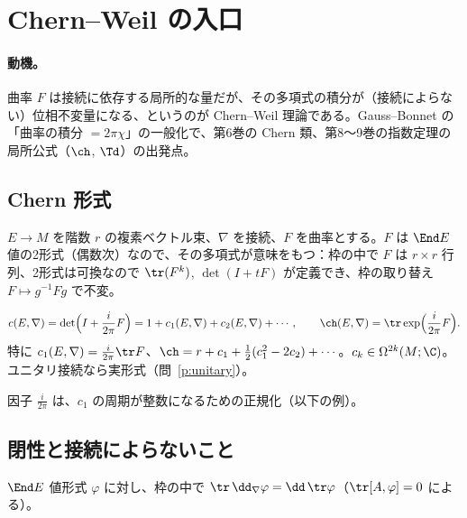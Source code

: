 
\section{Chern--Weil の入口}
\paragraph{動機。}曲率 $F$ は接続に依存する局所的な量だが、その多項式の積分が（接続によらない）位相不変量になる、というのが Chern--Weil 理論である。Gauss--Bonnet の「曲率の積分 $=2\pi\chi$」の一般化で、第6巻の Chern 類、第8〜9巻の指数定理の局所公式（$\ch$, $\Td$）の出発点。

\subsection{Chern 形式}
$E\to M$ を階数 $r$ の複素ベクトル束、$\nabla$ を接続、$F$ を曲率とする。$F$ は $\End E$ 値の2形式（偶数次）なので、その多項式が意味をもつ：枠の中で $F$ は $r\times r$ 行列、2形式は可換なので $\tr(F^k)$, $\det(I+tF)$ が定義でき、枠の取り替え $F\mapsto g^{-1}Fg$ で不変。
\begin{defn}
\[
c(E,\nabla)=\det\Bigl(I+\frac{i}{2\pi}F\Bigr)=1+c_1(E,\nabla)+c_2(E,\nabla)+\cdots,\qquad
\ch(E,\nabla)=\tr\exp\Bigl(\frac i{2\pi}F\Bigr).
\]
特に $c_1(E,\nabla)=\frac i{2\pi}\tr F$、$\ch=r+c_1+\tfrac12(c_1^2-2c_2)+\cdots$。$c_k\in\Omega^{2k}(M;\C)$。ユニタリ接続なら実形式（問~\ref{p:unitary}）。
\end{defn}
因子 $\frac i{2\pi}$ は、$c_1$ の周期が整数になるための正規化（以下の例）。

\subsection{閉性と接続によらないこと}
$\End E$ 値形式 $\varphi$ に対し、枠の中で $\tr\,\dd_\nabla\varphi=\dd\,\tr\varphi$（$\tr[A,\varphi]=0$ による）。

